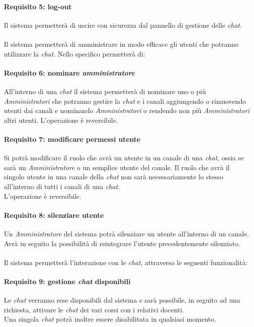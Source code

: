 \begin{enumerate}
\paragraph{Requisito 5: log-out\\}
Il sistema permetterà di uscire con sicurezza dal pannello di gestione delle \emph{chat}.\\
\\
Il sistema permetterà di amministrare in modo efficace gli utenti che potranno utilizzare la \emph{chat}. Nello specifico permetterà di:

\paragraph{Requisito 6: nominare \emph{amministratore}\\}
All’interno di una \emph{chat} il sistema permetterà di nominare uno o più \emph{Amministratori} che potranno gestire la \emph{chat} e i canali aggiungendo o rimuovendo utenti dai canali e nominando \emph{Amministratori} o rendendo non più \emph{Amministratori} altri utenti. L’operazione è reversibile.

\paragraph{Requisito 7: modificare permessi utente\\}
Si potrà modificare il ruolo che avrà un utente in un canale di una \emph{chat}, ossia se sarà un \emph{Amministratore} o un semplice utente del canale. Il ruolo che avrà il singolo utente in una canale della \emph{chat} non sarà necessariamente lo stesso all’interno di tutti i canali di una \emph{chat}.\\ 
L’operazione è reversibile.

\paragraph{Requisito 8: silenziare utente\\}
Un \emph{Amministratore} del sistema potrà silenziare un utente all’interno di un canale. Avrà in seguito la possibilità di reintegrare l’utente precedentemente silenziato.\\
\\
Il sistema permetterà l’interazione con le \emph{chat}, attraverso le seguenti funzionalità:

\paragraph{Requisito 9: gestione \emph{chat} disponibili\\}
Le \emph{chat} verranno rese disponibili dal sistema e sarà possibile, in seguito ad una richiesta, attivare le \emph{chat} dei vari corsi con i relativi docenti.\\ 
Una singola \emph{chat} potrà inoltre essere disabilitata in qualsiasi momento.


\end{enumerate}
